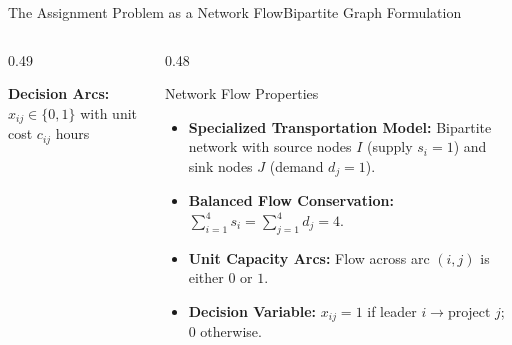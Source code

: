 \documentclass{beamer}
\begin{document}
\begin{frame}{The Assignment Problem as a Network Flow}{Bipartite Graph Formulation}
\begin{columns}[c]
\begin{column}{0.49\textwidth}

\vspace{0.3em}
\scriptsize\textbf{Decision Arcs:} $x_{ij} \in \{0, 1\}$ with unit cost $c_{ij}$ hours
\end{column}

\begin{column}{0.48\textwidth}
\begin{block}{Network Flow Properties}
\small
\begin{itemize}
    \item \textbf{Specialized Transportation Model:} Bipartite network with source nodes $I$ (supply $s_i = 1$) and sink nodes $J$ (demand $d_j = 1$).
    \item \textbf{Balanced Flow Conservation:} $\sum_{i=1}^4 s_i = \sum_{j=1}^4 d_j = 4$.
    \item \textbf{Unit Capacity Arcs:} Flow across arc $(i,j)$ is either $0$ or $1$.
    \item \textbf{Decision Variable:} $x_{ij} = 1$ if leader $i \to \text{project } j$; $0$ otherwise.
\end{itemize}
\end{block}
\end{column}
\end{columns}
\end{frame}
\end{document}

